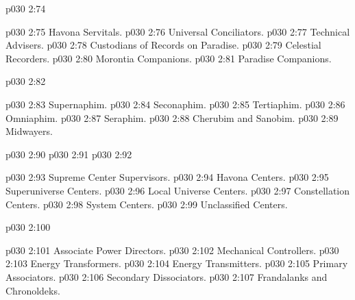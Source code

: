 \pc \vs p030 2:74 \bibnobreakspace {}
\begin{ubquote}
\pc \vs p030 2:75 \bibnobreakspace Havona Servitals.
\vs p030 2:76 \bibnobreakspace Universal Conciliators.
\vs p030 2:77 \bibnobreakspace Technical Advisers.
\vs p030 2:78 \bibnobreakspace Custodians of Records on Paradise.
\vs p030 2:79 \bibnobreakspace Celestial Recorders.
\vs p030 2:80 \bibnobreakspace Morontia Companions.
\vs p030 2:81 \bibnobreakspace Paradise Companions.
\end{ubquote}
\pc \vs p030 2:82 \bibnobreakspace {}
\begin{ubquote}
\pc \vs p030 2:83 \bibnobreakspace Supernaphim.
\vs p030 2:84 \bibnobreakspace Seconaphim.
\vs p030 2:85 \bibnobreakspace Tertiaphim.
\vs p030 2:86 \bibnobreakspace Omniaphim.
\vs p030 2:87 \bibnobreakspace Seraphim.
\vs p030 2:88 \bibnobreakspace Cherubim and Sanobim.
\vs p030 2:89 \bibnobreakspace Midwayers.
\end{ubquote}
\pc \vs p030 2:90 \bibnobreakspace {}
\pc \vs p030 2:91 \bibnobreakspace {}
\pc \vs p030 2:92 \bibnobreakspace {}
\begin{ubquote}
\pc \vs p030 2:93 \bibnobreakspace Supreme Center Supervisors.
\vs p030 2:94 \bibnobreakspace Havona Centers.
\vs p030 2:95 \bibnobreakspace Superuniverse Centers.
\vs p030 2:96 \bibnobreakspace Local Universe Centers.
\vs p030 2:97 \bibnobreakspace Constellation Centers.
\vs p030 2:98 \bibnobreakspace System Centers.
\vs p030 2:99 \bibnobreakspace Unclassified Centers.
\end{ubquote}
\pc \vs p030 2:100 \bibnobreakspace {}
\begin{ubquote}
\pc \vs p030 2:101 \bibnobreakspace Associate Power Directors.
\vs p030 2:102 \bibnobreakspace Mechanical Controllers.
\vs p030 2:103 \bibnobreakspace Energy Transformers.
\vs p030 2:104 \bibnobreakspace Energy Transmitters.
\vs p030 2:105 \bibnobreakspace Primary Associators.
\vs p030 2:106 \bibnobreakspace Secondary Dissociators.
\vs p030 2:107 \bibnobreakspace Frandalanks and Chronoldeks.
\end{ubquote}

